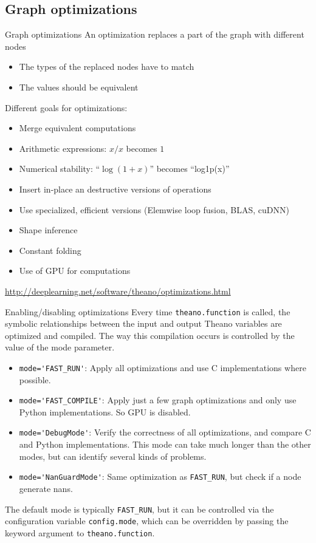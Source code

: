 \documentclass[a4paper,9pt]{beamer}
\begin{document}
\subsection{Graph optimizations}

\begin{frame}{Graph optimizations}
  An optimization replaces a part of the graph with different nodes
  \begin{itemize}
    \item The types of the replaced nodes have to match
    \item The values should be equivalent
  \end{itemize}
  Different goals for optimizations:
  \begin{itemize}
    \item Merge equivalent computations
    \item Arithmetic expressions: $x / x$ becomes $1$
    \item Numerical stability: ``$\log (1 + x)$'' becomes ``log1p(x)''
    \item Insert in-place an destructive versions of operations
    \item Use specialized, efficient versions (Elemwise loop fusion, BLAS, cuDNN)
    \item Shape inference
    \item Constant folding
    \item Use of GPU for computations
  \end{itemize}
  \url{http://deeplearning.net/software/theano/optimizations.html}
\end{frame}

\begin{frame}[fragile]{Enabling/disabling optimizations}
  Every time \verb|theano.function| is called, the symbolic relationships between the input and output Theano variables are optimized and compiled. The way this compilation occurs is controlled by the value of the mode parameter.
  \begin{itemize}
    \item \verb|mode='FAST_RUN'|: Apply all optimizations and use C implementations where possible.
    \item \verb|mode='FAST_COMPILE'|: Apply just a few graph optimizations and only use Python implementations. So GPU is disabled.
    \item \verb|mode='DebugMode'|: Verify the correctness of all optimizations, and compare C and Python implementations. This mode can take much longer than the other modes, but can identify several kinds of problems.
    \item \verb|mode='NanGuardMode'|: Same optimization as \verb|FAST_RUN|, but check if a node generate nans.
  \end{itemize}
  
  The default mode is typically \verb|FAST_RUN|, but it can be controlled via the configuration variable \verb|config.mode|, which can be overridden by passing the keyword argument to \verb|theano.function|.

\end{frame}
\end{document}
